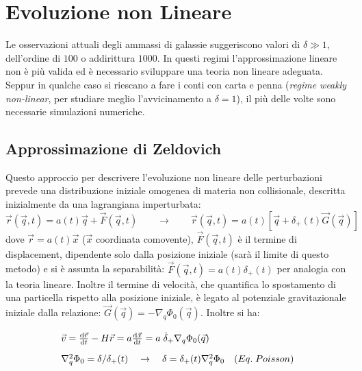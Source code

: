 \chapter{Evoluzione non Lineare}\label{9:ch}
Le osservazioni attuali degli ammassi di galassie suggeriscono valori di $\delta \gg 1$, dell'ordine di $100$ o addirittura $1000$. In questi regimi l'approssimazione lineare non è più valida ed è necessario sviluppare una teoria non lineare adeguata. Seppur in qualche caso si riescano a fare i conti con carta e penna (\textit{regime weakly non-linear}, per studiare meglio l'avvicinamento a $\delta = 1$), il più delle volte sono necessarie simulazioni numeriche. 


\section{Approssimazione di Zeldovich}
Questo approccio per descrivere l'evoluzione non lineare delle perturbazioni prevede una distribuzione iniziale omogenea di materia non collisionale, descritta inizialmente da una lagrangiana imperturbata:
\begin{equation}
    \vec{r}(\vec{q},t)=a(t)\vec{q}+\vec{F}(\vec{q},t) \qquad \rightarrow \qquad \vec{r}(\vec{q},t)=a(t)\left[\vec{q}+\delta_+ (t) \vec{G}(\vec{q})\right]\label{eq9:zelapprox}
\end{equation}
dove $\vec{r}=a(t)\vec{x}$ ($\vec{x}$ coordinata comovente), $\vec{F}(\vec{q},t)$ è il termine di displacement, dipendente solo dalla posizione iniziale (sarà il limite di questo metodo) e si è assunta la separabilità: $\vec{F}(\vec{q},t)=a(t)\delta_+ (t)$ per analogia con la teoria lineare. Inoltre il termine di velocità, che quantifica lo spostamento di una particella rispetto alla posizione iniziale, è legato al potenziale gravitazionale iniziale dalla relazione: $\vec{G}(\vec{q})= -\nabla_q \Phi_0 (\vec{q})$. Inoltre si ha:
\begin{equation*}\left.
    \def\arraystretch{1.8}
        \begin{array}{l}
        \vec{v}=\frac{\d{\vec{r}}}{\d{t}}-H\vec{r}=a\frac{\d{\vec{x}}}{\d{t}}=a\;\dot{\delta}_+\nabla_q \Phi_0 (\vec{q}) \\
        \nabla^2_q \Phi_0 = \delta / \delta_+ (t) \quad\rightarrow\quad \delta = \delta_+ (t)\nabla^2_q \Phi_0  \quad (Eq.\; Poisson)
        
    \end{array}\right. 
\end{equation*}
